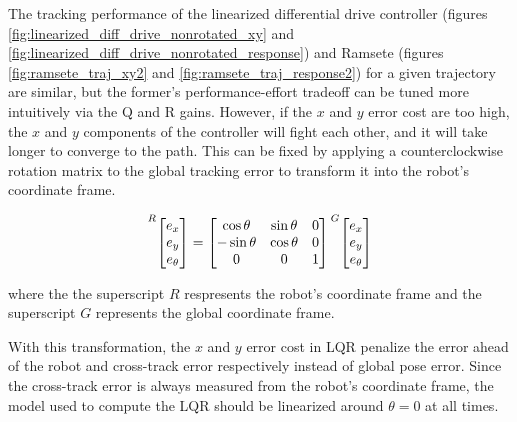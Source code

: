 The tracking performance of the linearized differential drive controller
(figures \ref{fig:linearized_diff_drive_nonrotated_xy} and
\ref{fig:linearized_diff_drive_nonrotated_response}) and Ramsete (figures
\ref{fig:ramsete_traj_xy2} and \ref{fig:ramsete_traj_response2}) for a given
trajectory are similar, but the former's performance-effort tradeoff can be
tuned more intuitively via the Q and R gains. However, if the $x$ and $y$ error
cost are too high, the $x$ and $y$ components of the controller will fight each
other, and it will take longer to converge to the path. This can be fixed by
applying a counterclockwise rotation matrix to the global tracking error to
transform it into the robot's coordinate frame.

\begin{equation*}
  \prescript{R}{}{\begin{bmatrix}
    e_x \\
    e_y \\
    e_\theta
  \end{bmatrix}} =
  \begin{bmatrix}
    \cos\theta & \sin\theta & 0 \\
    -\sin\theta & \cos\theta & 0 \\
    0 & 0 & 1
  \end{bmatrix}
  \prescript{G}{}{\begin{bmatrix}
    e_x \\
    e_y \\
    e_\theta
  \end{bmatrix}}
\end{equation*}

where the the superscript $R$ respresents the robot's coordinate frame and the
superscript $G$ represents the global coordinate frame.

With this transformation, the $x$ and $y$ error cost in LQR penalize the error
ahead of the robot and cross-track error respectively instead of global pose
error. Since the cross-track error is always measured from the robot's
coordinate frame, the \gls{model} used to compute the LQR should be linearized
around $\theta = 0$ at all times.

